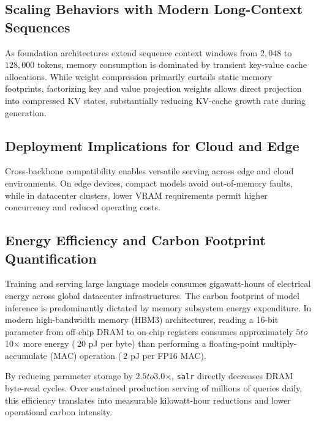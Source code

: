 \subsection{Scaling Behaviors with Modern Long-Context Sequences}
As foundation architectures extend sequence context windows from $2{,}048$ to $128{,}000$ tokens, memory consumption is dominated by transient key-value cache allocations. While weight compression primarily curtails static memory footprints, factorizing key and value projection weights allows direct projection into compressed KV states, substantially reducing KV-cache growth rate during generation.

\subsection{Deployment Implications for Cloud and Edge}
Cross-backbone compatibility enables versatile serving across edge and cloud environments. On edge devices, compact models avoid out-of-memory faults, while in datacenter clusters, lower VRAM requirements permit higher concurrency and reduced operating costs.

\subsection{Energy Efficiency and Carbon Footprint Quantification}
Training and serving large language models consumes gigawatt-hours of electrical energy across global datacenter infrastructures. The carbon footprint of model inference is predominantly dictated by memory subsystem energy expenditure. In modern high-bandwidth memory (HBM3) architectures, reading a 16-bit parameter from off-chip DRAM to on-chip registers consumes approximately $5$\times$ to $10$\times$ more energy ($~20$ pJ per byte) than performing a floating-point multiply-accumulate (MAC) operation ($~2$ pJ per FP16 MAC).

By reducing parameter storage by $2.5$\times$ to $3.0$\times$, \texttt{salr} directly decreases DRAM byte-read cycles. Over sustained production serving of millions of queries daily, this efficiency translates into measurable kilowatt-hour reductions and lower operational carbon intensity.
